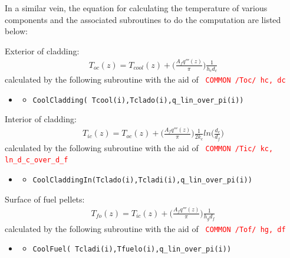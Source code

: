 \documentclass[a4paper, 12pt]{article}
\begin{document}
In a similar vein, the equation for calculating the temperature of various components and the associated subroutines to do the computation are listed below:

Exterior of cladding:
\begin{align}
T_{oc}(z)=T_{cool}(z)+ \bigg(\frac{A_f q'''(z)}{\pi}\bigg) \frac{1}{h_c d_c} \label{Tclado}
\end{align}
calculated by the following subroutine with the aid of \texttt{ \textcolor{red}{COMMON /Toc/   hc, dc} }
\begin{itemize}
	\item[]
	\begin{itemize}
	\item \texttt{\textcolor{subr}{CoolCladding}(   Tcool(i),Tclado(i),q\_lin\_over\_pi(i))}
	\end  {itemize}
\end  {itemize}

Interior of cladding:
\begin{align}
T_{ic}(z) = T_{oc}(z) + \bigg(\frac{A_f q'''(z)}{\pi}\bigg) \frac{1}{2 k_c} ln\bigg(\frac{d_c}{d_f}\bigg) \label{Tcladi}
\end{align}
calculated by the following subroutine with the aid of \texttt{ \textcolor{red} {COMMON /Tic/   kc, ln\_d\_c\_over\_d\_f} }
\begin{itemize}
	\item[]
	\begin{itemize}
	\item \texttt{\textcolor{subr}{CoolCladdingIn}(Tclado(i),Tcladi(i),q\_lin\_over\_pi(i))}
	\end  {itemize}
\end  {itemize}

Surface of fuel pellets:
\begin{align}
T_{fo}(z) = T_{ic}(z) + \bigg(\frac{A_f q'''(z)}{\pi}\bigg) \frac{1}{h_g d_f}
\label{Tfuelo}
\end{align}
calculated by the following subroutine with the aid of \texttt{ \textcolor{red} {COMMON /Tof/   hg, df} }
\begin{itemize}
	\item[]
	\begin{itemize}
	\item \texttt{\textcolor{subr}{CoolFuel}(      Tcladi(i),Tfuelo(i),q\_lin\_over\_pi(i))}
	\end  {itemize}
\end  {itemize}
\end{document}
